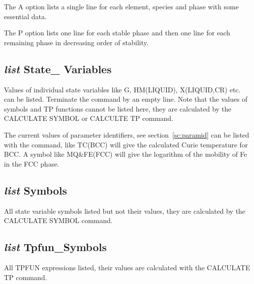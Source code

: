 \documentclass[12pt]{article}
\begin{document}
The A option lists a single line for each element, species and phase
with some essential data.

The P option lists one line for each stable phase and then one line
for each remaining phase in decreasing order of stability.

\subsection{{\em list} State\_ Variables}

Values of individual state variables like G, HM(LIQUID), X(LIQUID,CR)
etc. can be listed.  Terminate the command by an empty line.  Note
that the values of symbols and TP functions cannot be listed here,
they are calculated by the CALCULATE SYMBOL or CALCULTE TP command.

The current values of parameter identifiers, see
section~\ref{sc:paramid} can be listed with the command, like TC(BCC)
will give the calculated Curie temperature for BCC.  A symbol like
MQ\&FE(FCC) will give the logarithm of the mobility of Fe in the FCC
phase.

\subsection{{\em list} Symbols}

All state variable symbols listed but not their values, they are
calculated by the CALCULATE SYMBOL command.

\subsection{{\em list} Tpfun\_Symbols}

All TPFUN expressions listed, their values are calculated with the
CALCULATE TP command.

\end{document}
